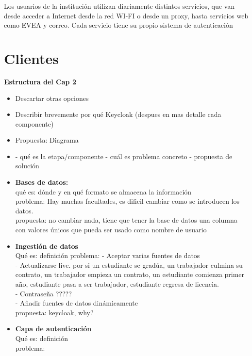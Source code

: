 
Los usuarios de la institución utilizan diariamente distintos servicios, que van desde acceder a Internet desde la red WI-FI o desde un proxy, hasta servicios web como EVEA y correo. Cada servicio tiene su propio sistema de autenticación

\section*{Clientes}


\textbf{Estructura del Cap 2}

\begin{itemize}
	\item Descartar otras opciones
	\item Describir brevemente por qué Keycloak (despues en mas detalle cada componente)
	\item Propuesta: Diagrama
	\\
	\item
	-	qué es la etapa/componente
	-	cuál es problema concreto
	-	propuesta de solución
	\\
	\item \textbf{	Bases de datos: }
	\\
	qué es: dónde y en qué formato se almacena la información\\
	problema: Hay muchas facultades, es dificil cambiar como se introducen los datos. \\
	propuesta: no cambiar nada, tiene que tener la base de datos una columna con valores únicos que pueda ser usado como nombre de usuario
	\\
	\item \textbf{Ingestión de datos}
	\\
	Qué es: definición
	problema:
	- Aceptar varias fuentes de datos\\
	- Actualizarse live. por si un estudiante se gradúa, un trabajador culmina su contrato, un trabajador empieza un contrato, un estudiante comienza primer año, estudiante pasa a ser trabajador, estudiante regresa de licencia.\\
	- Contraseña ?????\\
	- Añadir fuentes de datos dinámicamente\\
	propuesta: keycloak, why?
	\\
	\item \textbf{Capa de autenticación}\\
	Qué es: definición\\
	problema:\\

\end{itemize}
